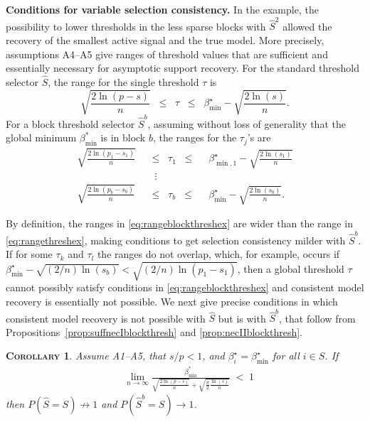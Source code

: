 \documentclass[aos]{imsart}
\theoremstyle{plain}
\newtheorem{cor}[thm]{\textsc{Corollary}}
\begin{document}
\noindent\textbf{Conditions for variable selection consistency.} In the example, the possibility to lower thresholds in the less sparse blocks with $\hat S^2$ allowed the recovery of the smallest active signal and the true model. More precisely, assumptions A4--A5 give ranges of threshold values that are sufficient and essentially necessary for asymptotic support recovery. For the standard threshold selector $\hat{S}$, the range for the single threshold $\tau$ is
\begin{equation}\label{eq:rangethreshex}
  \sqrt{\frac{2\ln(p-s)}{n}}\;\;\leq\;\;\tau\;\;\leq\;\;\beta^{\star}_{\min}-\sqrt{\frac{2\ln(s)}{n}}.	
\end{equation}
For a block threshold selector $\hat{S}^{b}$, assuming without loss of generality that the global minimum $\beta_{\min}^*$ is in block $b$, the ranges for the $\tau_j$'s are
    \begin{eqnarray}\label{eq:rangeblockthreshex}
  \sqrt{\frac{2\ln(p_1-s_1)}{n}}\;\;&\leq\;\;\tau_1\;\;\leq&\;\;\beta^{\star}_{\min,1}-\sqrt{\frac{2\ln(s_1)}{n}}\nonumber\\
  &\;\;\vdots \\
  \sqrt{\frac{2\ln(p_b-s_b)}{n}}\;\;&\leq\;\;\tau_b\;\;\leq&\;\;\beta^{\star}_{\min}-\sqrt{\frac{2\ln(s_b)}{n}} \nonumber.       
    \end{eqnarray}

By definition, the ranges in \eqref{eq:rangeblockthreshex} are wider than the range in \eqref{eq:rangethreshex}, making conditions to get selection consistency milder with $\hat S^b$. If for some $\tau_k$ and $\tau_l$ the ranges do not overlap, which, for example, occurs if $\beta_{\min}^{\star} - \sqrt{(2/n) \ln(s_b)} < \sqrt{(2/n) \ln(p_1-s_1)}$,
then a global threshold $\tau$ cannot possibly satisfy conditions in 
\eqref{eq:rangeblockthreshex} and consistent model recovery is essentially not possible.
We next give precise conditions in which consistent model recovery is not possible with $\hat{S}$ but is with $\hat{S}^b$, that follow from Propositions~\ref{prop:suffnecIblockthresh} and \ref{prop:necIIblockthresh}.

\begin{cor}\label{cor:selconstimpossible}
Assume A1--A5, that $s/p<1$, and $\beta^{\star}_i=\beta_{\min}^{\star}$ for all $i \in S$. If
\begin{eqnarray*}
    &\lim_{n\to \infty}\frac{\beta_{\min}^*}{\sqrt{\tfrac{2\ln(p-s)}{n}}+\sqrt{\tfrac{\pi}{2}\tfrac{\ln(s)}{n}}}\;<\; 1 
\end{eqnarray*}
then 
$P(\hat{S} = S)\not \to 1$ and $P(\hat{S}^{b} = S)\to 1$.
\end{cor}
\end{document}
